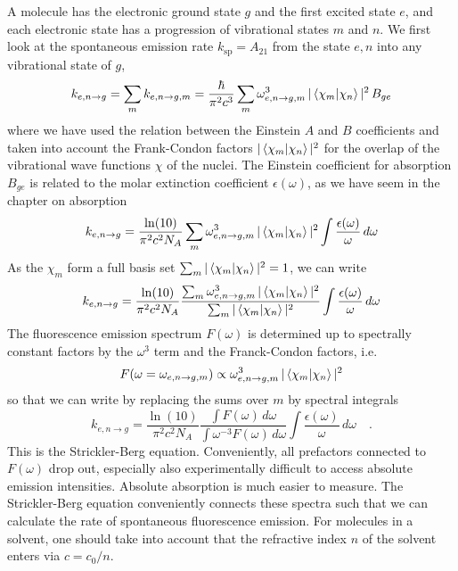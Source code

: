 A molecule has the electronic ground state $g$ and the first excited state $e$, and each electronic state has a progression of vibrational states $m$ and $n$. We first look at the spontaneous emission rate  $k_{\text{sp}} =  A_{21}$
from the state $e,n$ into any vibrational state of $g$, 
%
\begin{equation}
k_{e,n \rightarrow g}  = \sum_m  k_{e,n \rightarrow g,m}  = \frac{\hbar}{\pi^2 c^3} \sum_m  \omega_{e,n \rightarrow g,m}^3 \,  | \braket{\chi_m |  \chi_n} |^2 \, B_{ge} 
\end{equation}
where we have used the relation between the Einstein $A$ and $B$ coefficients and taken into account the Frank-Condon factors $ | \braket {\chi_m | \chi_n} |^2 $ for the overlap of the vibrational wave functions $\chi$ of the nuclei.
%
The Einstein coefficient for absorption $B_{ge} $ is related to the molar extinction coefficient $\epsilon(\omega)$, as we have seem in the chapter on absorption
\begin{equation}
 k_{e,n \rightarrow g}  = \frac{\ln(10)}{\pi^2 c^2 N_A} \sum_m  \omega_{e,n \rightarrow g,m}^3 \,  | \braket{\chi_m |  \chi_n} |^2
 \int \frac{\epsilon(\omega)}{\omega} \, d \omega
\end{equation}
%
As the  $\chi_m$ form a full basis set $\sum_m  | \braket {\chi_m | \chi_n} |^2 = 1$,  we can write
\begin{equation}
 k_{e,n \rightarrow g}  = \frac{\ln(10)}{\pi^2 c^2 N_A} 
%
\frac{ 
 \sum_m  \omega_{e,n \rightarrow g,m}^3 \,  | \braket{\chi_m |  \chi_n} |^2 }
 { \sum_m  | \braket {\chi_m | \chi_n} |^2 }
 \int \frac{\epsilon(\omega)}{\omega} \, d \omega
\end{equation}
The fluorescence emission spectrum $F(\omega)$ is determined up to spectrally constant factors by the $\omega^3$ term and the Franck-Condon factors, i.e.
\begin{equation}
 F(\omega =  \omega_{e,n \rightarrow g,m} )  \propto  \omega_{e,n \rightarrow g,m}^3 \,  | \braket{\chi_m |  \chi_n} |^2 
\end{equation}
so that we can write by replacing the sums over $m$ by  spectral integrals
\begin{equation}
 k_{e,n \rightarrow g}  =  \frac{\ln(10)}{\pi^2 c^2 N_A} \frac{\int F(\omega) \, d \omega}{\int \omega^{-3} F(\omega) \, d \omega }
 \int \frac{\epsilon(\omega)}{\omega} \, d \omega   \quad. 
\end{equation}
This is the Strickler-Berg equation. Conveniently, all prefactors connected to $F(\omega)$ drop out, especially also experimentally difficult to access absolute emission intensities. Absolute absorption is much  easier to measure. The Strickler-Berg equation conveniently connects these spectra such that we can calculate the rate of spontaneous fluorescence emission. For molecules in a solvent, one should take into account that the refractive index $n$ of the solvent enters via $c = c_0 / n$. 

